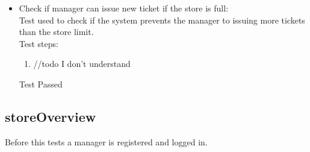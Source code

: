 \begin{itemize}
    \item Check if manager can issue new ticket if the store is full: \\
    Test used to check if the system prevents the manager to issuing more tickets than the store limit. \\
    Test steps: \\
    \begin{enumerate}
        \item //todo I don't understand
    \end{enumerate}
    Test Passed\\
\end{itemize}

\subsection{storeOverview}

Before this tests a manager is registered and logged in.

